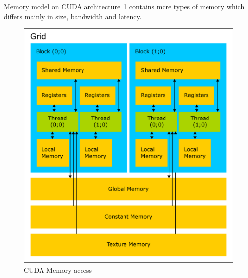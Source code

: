 Memory model on CUDA architecture~\ref{fig:cudamemaccess} contains more types of memory which differs mainly in size, bandwidth and latency.

\begin{figure}[h]
  \centering
  \includegraphics[width=0.6\linewidth]{img/CUDAmemAccess.eps}
  \caption{CUDA Memory access}
  \label{fig:cudamemaccess}
\end{figure}

